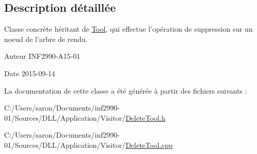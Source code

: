 \subsection{Description détaillée}
Classe concrète héritant de \hyperlink{class_tool}{Tool}, qui effectue l'opération de suppression sur un noeud de l'arbre de rendu. 

\begin{DoxyAuthor}{Auteur}
I\-N\-F2990-\/\-A15-\/01 
\end{DoxyAuthor}
\begin{DoxyDate}{Date}
2015-\/09-\/14 
\end{DoxyDate}


La documentation de cette classe a été générée à partir des fichiers suivants \-:\begin{DoxyCompactItemize}
\item 
C\-:/\-Users/saron/\-Documents/inf2990-\/01/\-Sources/\-D\-L\-L/\-Application/\-Visitor/\hyperlink{_delete_tool_8h}{Delete\-Tool.\-h}\item 
C\-:/\-Users/saron/\-Documents/inf2990-\/01/\-Sources/\-D\-L\-L/\-Application/\-Visitor/\hyperlink{_delete_tool_8cpp}{Delete\-Tool.\-cpp}\end{DoxyCompactItemize}
